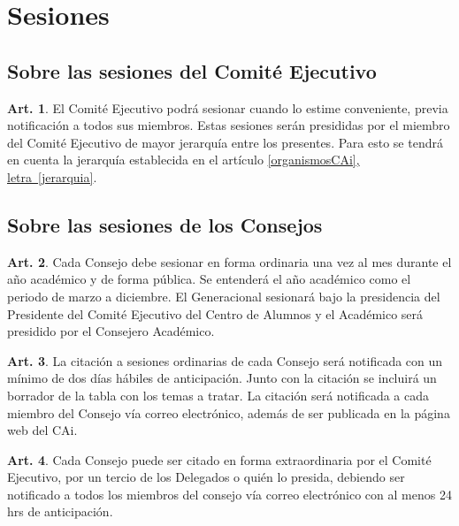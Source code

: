 \documentclass[letterpaper,11pt]{article}
\theoremstyle{definition}%
\newtheorem{art}{Art.} %
\newcommand{\aaref}[2]{\hyperref[#2]{\ref*{#1}, letra~\ref*{#2}}}
\begin{document}
\section{Sesiones}\label{sesiones}

\subsection*{Sobre las sesiones del Comité Ejecutivo}

\begin{art} \label{sesionesEjecutivo}
	El Comité Ejecutivo podrá sesionar cuando lo estime conveniente, previa notificación a todos sus miembros. Estas sesiones serán presididas por el miembro del Comité Ejecutivo de mayor jerarquía entre los presentes. Para esto se tendrá en cuenta la jerarquía establecida en el artículo  \aaref{organismosCAi}{jerarquia}.
\end{art}

\subsection*{Sobre las sesiones de los Consejos}

\begin{art}\label{consejos}
	Cada Consejo debe sesionar en forma ordinaria una vez al mes durante el año académico y de forma pública. Se entenderá el año académico como el periodo de marzo a diciembre. El Generacional sesionará bajo la presidencia del Presidente del Comité Ejecutivo del Centro de Alumnos y el Académico será presidido por el Consejero Académico.
\end{art}

\begin{art}\label{consejoOrdinario}
	La citación a sesiones ordinarias de cada Consejo será notificada con un mínimo de dos días hábiles de anticipación. Junto con la citación se incluirá un borrador de la tabla con los temas a tratar. La citación será notificada a cada miembro del Consejo vía correo electrónico, además de ser publicada en la página web del CAi.
\end{art}

\begin{art}\label{consejoExtraordinario}
	Cada Consejo puede ser citado en forma extraordinaria por el Comité Ejecutivo, por un tercio de los Delegados o quién lo presida, debiendo ser notificado a todos los miembros del consejo vía correo electrónico con al menos 24 hrs de anticipación.
\end{art}
\end{document}
